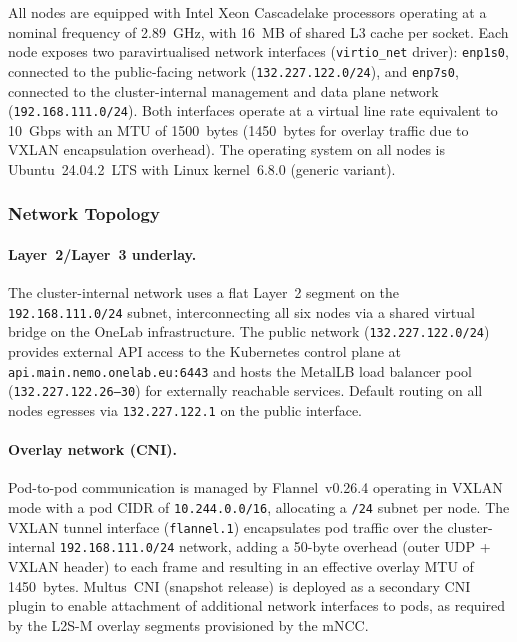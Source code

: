 All nodes are equipped with Intel Xeon Cascadelake processors
operating at a nominal frequency of 2.89~GHz, with 16~MB of shared
L3 cache per socket.
Each node exposes two paravirtualised network interfaces
(\texttt{virtio\_net} driver):
\texttt{enp1s0}, connected to the public-facing network
(\texttt{132.227.122.0/24}), and
\texttt{enp7s0}, connected to the cluster-internal management and
data plane network (\texttt{192.168.111.0/24}).
Both interfaces operate at a virtual line rate equivalent to 10~Gbps
with an MTU of 1500~bytes (1450~bytes for overlay traffic due to
VXLAN encapsulation overhead).
The operating system on all nodes is Ubuntu~24.04.2~LTS with
Linux kernel~6.8.0 (generic variant).

\subsubsection{Network Topology}
\label{subsubsec:topology}

\paragraph{Layer~2/Layer~3 underlay.}
The cluster-internal network uses a flat Layer~2 segment on the
\texttt{192.168.111.0/24} subnet, interconnecting all six nodes
via a shared virtual bridge on the OneLab infrastructure.
The public network (\texttt{132.227.122.0/24}) provides external
API access to the Kubernetes control plane at
\texttt{api.main.nemo.onelab.eu:6443} and hosts the MetalLB load
balancer pool (\texttt{132.227.122.26--30}) for externally
reachable services.
Default routing on all nodes egresses via \texttt{132.227.122.1}
on the public interface.

\paragraph{Overlay network (CNI).}
Pod-to-pod communication is managed by Flannel~v0.26.4 operating
in VXLAN mode with a pod CIDR of \texttt{10.244.0.0/16}, allocating
a \texttt{/24} subnet per node.
The VXLAN tunnel interface (\texttt{flannel.1}) encapsulates pod
traffic over the cluster-internal \texttt{192.168.111.0/24}
network, adding a 50-byte overhead (outer UDP + VXLAN header) to
each frame and resulting in an effective overlay MTU of 1450~bytes.
Multus~CNI (snapshot release) is deployed as a secondary CNI plugin
to enable attachment of additional network interfaces to pods, as
required by the L2S-M overlay segments provisioned by the mNCC.

